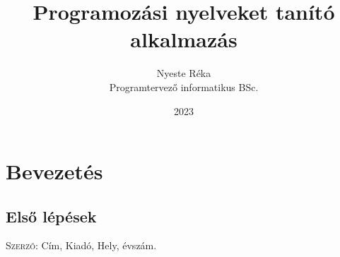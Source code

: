 \documentclass{thesis-ekf}
\begin{document}
	\title{Programozási nyelveket tanító alkalmazás}
	\author{Nyeste Réka\\Programtervező informatikus BSc.}
	\date{2023}
	\maketitle
	\tableofcontents
	\chapter{Bevezetés}
	\section{Első lépések}
	\begin{thebibliography}{1}
		 \textsc{Szerző}: Cím, Kiadó, Hely, évszám.
	\end{thebibliography}
\end{document}
